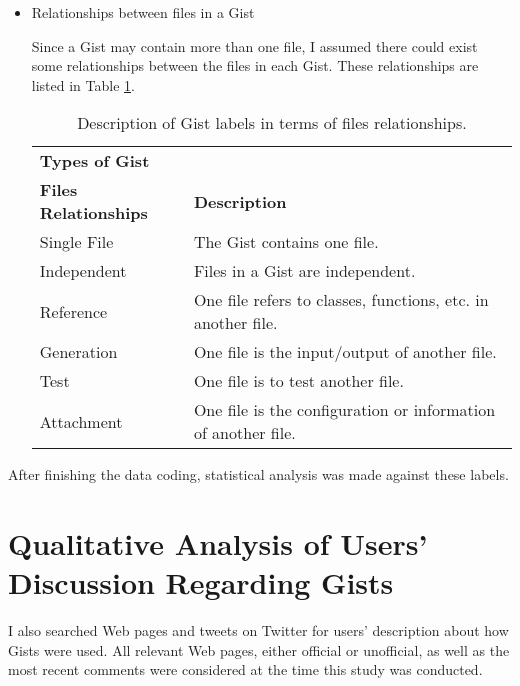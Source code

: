 \begin{itemize}
  \item Relationships between files in a Gist

  Since a Gist may contain more than one file, I assumed there could exist some relationships between the files in each Gist. These relationships are listed in Table \ref{tb:gistfilerelationshiplabels}.

\begin{table}[!htb]
 \begin{center}
 \begin{tabular}{ll} 
    \textbf{Types of Gist}	&	\\ 
    \textbf{Files Relationships}	& \textbf{Description}	\\  \hline
    Single File & The Gist contains one file.\\
    Independent & Files in a Gist are independent.\\
    Reference & One file refers to classes, functions, etc. in another file.\\ 
    Generation & One file is the input/output of another file.\\ 
    Test & One file is to test another file.\\ 
    Attachment & One file is the configuration or information of another file.\\ \hline
 \end{tabular}
 \end{center}
 \caption{Description of Gist labels in terms of files relationships.}
 \label{tb:gistfilerelationshiplabels}
\end{table}

\end{itemize}

After finishing the data coding, statistical analysis was made against these labels.

\section{Qualitative Analysis of Users' Discussion Regarding Gists}

I also searched Web pages and tweets on Twitter for users' description about how Gists were used. All relevant Web pages, either official or unofficial, as well as the most recent comments were considered at the time this study was conducted. 

